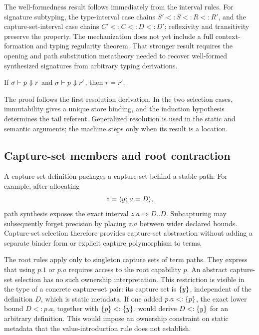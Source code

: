 \documentclass[acmsmall,screen,nonacm]{acmart}
\begin{document}
The well-formedness result follows immediately from the interval rules.  For
signature subtyping, the type-interval case chains
\(S'<:S<:R<:R'\), and the capture-set-interval case chains
\(C'<:C<:D<:D'\); reflexivity and transitivity preserve the property.
The mechanization does not yet include a full context-formation and typing
regularity theorem.  That stronger result requires the opening and path
substitution metatheory needed to recover well-formed synthesized signatures
from arbitrary typing derivations.

\begin{lemma}
\label{lem:resolution-determinism}
If \(\sigma\vdash p\Downarrow r\) and
\(\sigma\vdash p\Downarrow r'\), then \(r=r'\).
\end{lemma}

The proof follows the first resolution derivation.  In the two selection
cases, immutability gives a unique store binding, and the induction
hypothesis determines the tail referent.  Generalized resolution is used in
the static and semantic arguments; the machine steps only when its result is
a location.

\subsection{Capture-set members and root contraction}

A capture-set definition packages a capture set behind a stable path. For
example, after allocating
\[
  z=\langle y;\,a=D\rangle,
\]
path synthesis exposes the exact interval
\(z.a\Rightarrow D..D\). Subcapturing may subsequently forget precision by
placing \(z.a\) between wider declared bounds. Capture-set selection therefore
provides capture-set abstraction without adding a separate binder form or
explicit capture polymorphism to terms.

The root rules apply only to singleton capture sets of term paths.
They express that using \(p.1\) or \(p.a\) requires access to the root
capability \(p\). An abstract capture-set selection has no such ownership
interpretation. This restriction is visible in the type of a concrete
capture-set pair: its capture set is \(\{{y}\}\), independent of the definition
\(D\), which is static metadata. If one added \(p.a<:\{{p}\}\), the exact lower
bound \(D<:p.a\), together with \(\{{p}\}<:\{{y}\}\), would derive
\(D<:\{{y}\}\) for an arbitrary definition. This would impose an ownership
constraint on static metadata that the value-introduction rule does not
establish.
\end{document}
